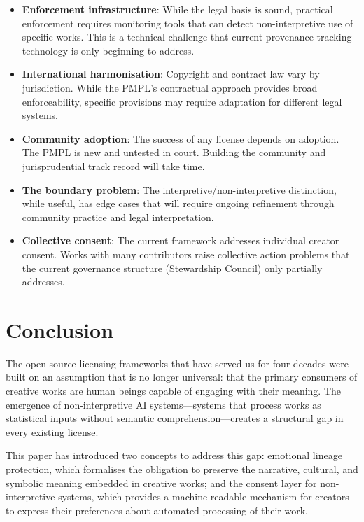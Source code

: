 \documentclass[11pt,twocolumn]{article}
\begin{document}
\begin{itemize}
    \item \textbf{Enforcement infrastructure}: While the legal basis is
          sound, practical enforcement requires monitoring tools that
          can detect non-interpretive use of specific works. This is a
          technical challenge that current provenance tracking technology
          is only beginning to address.
    \item \textbf{International harmonisation}: Copyright and contract
          law vary by jurisdiction. While the PMPL's contractual approach
          provides broad enforceability, specific provisions may require
          adaptation for different legal systems.
    \item \textbf{Community adoption}: The success of any license depends
          on adoption. The PMPL is new and untested in court. Building
          the community and jurisprudential track record will take time.
    \item \textbf{The boundary problem}: The interpretive/non-interpretive
          distinction, while useful, has edge cases that will require
          ongoing refinement through community practice and legal
          interpretation.
    \item \textbf{Collective consent}: The current framework addresses
          individual creator consent. Works with many contributors raise
          collective action problems that the current governance
          structure (Stewardship Council) only partially addresses.
\end{itemize}

\section{Conclusion}
\label{sec:conclusion}

The open-source licensing frameworks that have served us for four decades
were built on an assumption that is no longer universal: that the primary
consumers of creative works are human beings capable of engaging with
their meaning. The emergence of non-interpretive AI systems---systems
that process works as statistical inputs without semantic
comprehension---creates a structural gap in every existing license.

This paper has introduced two concepts to address this gap: emotional
lineage protection, which formalises the obligation to preserve the
narrative, cultural, and symbolic meaning embedded in creative works; and
the consent layer for non-interpretive systems, which provides a
machine-readable mechanism for creators to express their preferences
about automated processing of their work.
\end{document}
